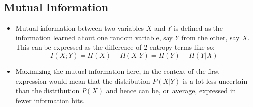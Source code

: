 \documentclass[12pt]{article}
\begin{document}
  \subsection{Mutual Information}
    \begin{itemize}
      \item Mutual information between two variables $X$ and $Y$ is defined as the information learned about one random variable, say $Y$ from the other, say $X$. This can be expressed as the difference of 2 entropy terms like so: $$I(X;Y) = H(X) - H(X|Y) = H(Y) - H(Y|X)$$
      \item Maximizing the mutual information here, in the context of the first expression would mean that the distribution $P(X|Y)$ is a lot less uncertain than the distribution $P(X)$ and hence can be, on average, expressed in fewer information bits.
    \end{itemize}
\end{document}
